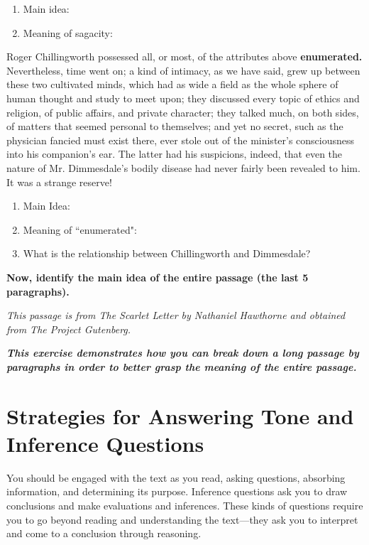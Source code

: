 \documentclass[12pt]{book}
\renewcommand{\indent}{\hspace{1cm}}
\begin{document}
\begin{enumerate} 
\item Main idea: \hrulefill
\item Meaning of sagacity: \hrulefill 
\end{enumerate}

\begin{linenumbers}
\modulolinenumbers[5]
\indent Roger Chillingworth possessed all, or most, of the attributes above \textbf{enumerated.} Nevertheless, time went on; a kind of intimacy, as we have said, grew up between these two cultivated minds, which had as wide a field as the whole sphere of human thought and study to meet upon; they discussed every topic of ethics and religion, of public affairs, and private character; they talked much, on both sides, of matters that seemed personal to themselves; and yet no secret, such as the physician fancied must exist there, ever stole out of the minister's consciousness into his companion's ear. The latter had his suspicions, indeed, that even the nature of Mr. Dimmesdale's bodily disease had never fairly been revealed to him. It was a strange reserve!
\end{linenumbers}

\begin{enumerate}
\item Main Idea: \hrulefill
\item Meaning of ``enumerated": \hrulefill 
\item What is the relationship between Chillingworth and Dimmesdale? \hrulefill
\end{enumerate}

\bigskip
\textbf{Now, identify the main idea of the entire passage (the last 5 paragraphs).}

\bigskip
\hrulefill

\bigskip
\textit{This passage is from The Scarlet Letter by Nathaniel Hawthorne and obtained from The Project Gutenberg.}

\bigskip
\textbf{\textit{This exercise demonstrates how you can break down a long passage by paragraphs in order to better grasp the meaning of the entire passage. }}

\newpage
\section[Tone and Inference]{Strategies for Answering Tone and Inference Questions}
You should be engaged with the text as you read, asking questions, absorbing information, and determining its purpose.
Inference questions ask you to draw conclusions and make evaluations and inferences.  These kinds of questions require you to go beyond reading and understanding the text—they ask you to interpret and come to a conclusion through reasoning.
\end{document}
